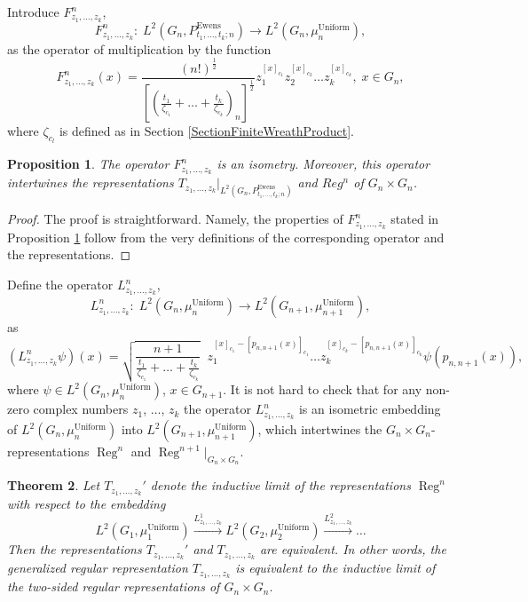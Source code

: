 \documentclass[12pt]{amsart}
\newtheorem{thm}{Theorem}[section]
\newtheorem{prop}[thm]{Proposition}
\theoremstyle{definition}
\numberwithin{equation}{section}
\DeclareMathOperator{\Ewens}{Ewens}
\DeclareMathOperator{\Uniform}{Uniform}
\DeclareMathOperator{\Reg}{Reg}
\begin{document}
Introduce  $F_{z_1,\ldots,z_k}^n$,
$$
F_{z_1,\ldots,z_k}^n:\;L^2\left(G_n,P_{t_1,\ldots,t_k;n}^{\Ewens}\right)\longrightarrow L^2\left(G_n,\mu_n^{\Uniform}\right),
$$
as the operator of multiplication by the function
\begin{equation}\label{3.7.1}
F_{z_1,\ldots,z_k}^n(x)=\frac{\left(n!\right)^{\frac{1}{2}}}{\left[\left(\frac{t_1}{\zeta_{c_1}}+\ldots+\frac{t_k}{\zeta_{c_k}}\right)_n\right]^{\frac{1}{2}}}
z_1^{[x]_{c_1}}z_2^{[x]_{c_2}}\ldots z_k^{[x]_{c_k}},\; x\in G_n,
\end{equation}
where $\zeta_{c_l}$ is defined as in Section \ref{SectionFiniteWreathProduct}.
\begin{prop}\label{Proposition3.7.1} The operator $F^n_{z_1,\ldots,z_k}$ is an isometry. Moreover, this operator intertwines the representations
$T_{z_1,\ldots,z_k}\biggl|_{L^2\left(G_n,P_{t_1,\ldots,t_k;n}^{\Ewens}\right)}$ and $Reg^n$ of $G_n\times G_n$.
\end{prop}
\begin{proof} The proof is straightforward. Namely, the properties of $F_{z_1,\ldots,z_k}^{n}$ stated in Proposition \ref{Proposition3.7.1}
follow from the very definitions of the corresponding operator and the representations.
\end{proof}
 Define the operator $L_{z_1,\ldots,z_k}^n$,
$$
L_{z_1,\ldots,z_k}^n:\;  L^2\left(G_n,\mu_n^{\Uniform}\right)\longrightarrow L^2\left(G_{n+1},\mu_{n+1}^{\Uniform}\right),
$$
as
\begin{equation}\label{3.3.5}
\left(L_{z_1,\ldots,z_k}^n\psi\right)(x)=\sqrt{\frac{n+1}{\frac{t_1}{\zeta_{c_1}}+\ldots+\frac{t_k}{\zeta_{c_k}}}}\;\;
z_1^{[x]_{c_1}-\left[p_{n,n+1}\left(x\right)\right]_{c_1}}\ldots z_k^{[x]_{c_k}-\left[p_{n,n+1}\left(x\right)\right]_{c_k}}
\psi\left(p_{n,n+1}(x)\right),
\end{equation}
where  $\psi\in L^2\left(G_n,\mu_n^{\Uniform}\right)$, $x\in G_{n+1}$.
It is not hard to check that
for any non-zero complex numbers $z_1$, $\ldots$, $z_k$ the operator $L_{z_1,\ldots,z_k}^n$ is an isometric embedding of $L^2\left(G_n,\mu_n^{\Uniform}\right)$ into $L^2\left(G_{n+1},\mu_{n+1}^{\Uniform}\right)$,
which intertwines the $G_n\times G_n$-representations $\Reg^n$ and $\Reg^{n+1}\biggl|_{G_n\times G_n}$.
\begin{thm} \label{THEOREM6.3}
Let $T_{z_1,\ldots,z_k}'$ denote the inductive limit of the representations $\Reg^n$ with respect to the embedding
$$
 L^2\left(G_1,\mu_1^{\Uniform}\right)\overset{L_{z_1,\ldots,z_k}^1}{\longrightarrow} L^2\left(G_2,\mu_2^{\Uniform}\right)\overset{L_{z_1,\ldots,z_k}^2}{\longrightarrow}\ldots
$$
Then the representations $T_{z_1,\ldots,z_k}'$ and $T_{z_1,\ldots,z_k}$ are equivalent. In other words, the generalized regular representation $T_{z_1,\ldots,z_k}$ is equivalent to the inductive limit of the two-sided regular representations of $G_n\times G_{n}$.
\end{thm}
\end{document}
